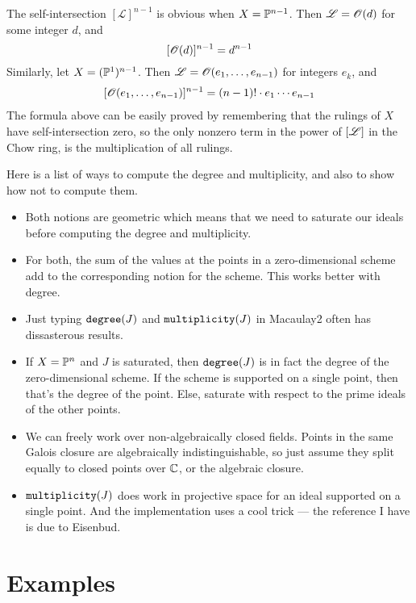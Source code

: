 \documentclass[fleqn,reqno]{amsart}
\begin{document}
\begin{paragraf}
\label{par:self-intersection}
The self-intersection $[\mathscr L]^{n-1}$ is obvious when $X=\mathbb{P}^{n-1}$.
Then $\mathscr L=\mathscr{O}(d)$ for some integer $d$, and
\[
	[\mathscr{O}(d)]^{n-1}=d^{n-1}
\]
Similarly, let $X=(\mathbb{P}^1)^{n-1}$. Then $\mathscr{L}=\mathscr{O}(e_1,\ldots,e_{n-1})$ for integers $e_k$,
and
\begin{align}
	\label{eq:formula-prod-P1}
	[\mathscr{O}(e_1,\ldots,e_{n-1})]^{n-1}=(n-1)!\cdot e_1\cdots e_{n-1}
\end{align}
The formula above can be easily proved by remembering that the rulings of $X$ have
self-intersection zero,
so the only nonzero term in the power of $[\mathscr{L}]$ in the Chow ring, is the multiplication
of all rulings.
\end{paragraf}

\begin{example}
Here is a list of ways to compute the degree and multiplicity, and also
to show how not to compute them.
\begin{itemize}
	\item Both notions are geometric which means that we need to saturate our ideals
	before computing the degree and multiplicity.
	\item For both, the sum of the values at the points in a zero-dimensional scheme
	add to the corresponding notion for the scheme.
	This works better with degree.
	\item Just typing $\mathop{\tt degree}(J)$ and $\mathop{\tt multiplicity}(J)$ in Macaulay2 often
	has dissasterous results.
	\item If $X=\mathbb{P}^n$ and $J$ is saturated, then $\mathop{\tt degree}(J)$ is in fact the degree
	of the zero-dimensional scheme.
	If the scheme is supported on a single point, then that's the degree of the point.
	Else, saturate with respect to the prime ideals of the other points.
	\item We can freely work over non-algebraically closed fields.
	Points in the same Galois closure are algebraically indistinguishable,
	so just assume they split equally to closed points over $\mathbb{C}$, or the algebraic closure.
	\item $\mathop{\tt multiplicity}(J)$ does work in projective space for an ideal supported
	on a single point.
	And the implementation uses a cool trick --- the reference I have is due to Eisenbud.
\end{itemize}
\end{example}



\section{Examples}
\label{sec:def-examples}
\end{document}
